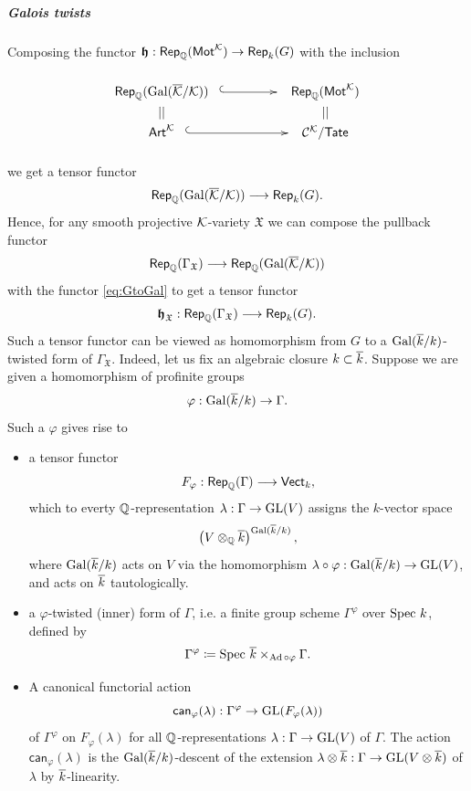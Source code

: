 \documentclass[twoside,leqno]{article}
\numberwithin{equation}{section}
\theoremstyle{plain}
\theoremstyle{definition}
\begin{document}
\subparagraph{Galois twists} \label{subpar:galois}

Composing the functor $\boldsymbol{\mathfrak{h}} : \mathsf{Rep}_{\mathbb Q}(\mathsf{Mot}^{\mathcal K}) \to
 \mathsf{Rep}_{k}(G)$ with the inclusion
\[
\xymatrix@R-3.5pc@M+0.7pc@C+1.5pc{
  \mathsf{Rep}_{\bbQ}(\Gal(\kaybar/\kay))  \ar@{^{(}->}[r]
  & \mathsf{Rep}_{\bbQ}(\motM^{\kay})  \\
|| & ||  \\
\mathsf{Art}^{\kay} \ar@{^{(}->}[r] & \CA{\kay}/\mathsf{Tate}  
}
\]
we get a tensor functor
\begin{equation} \label{eq:GtoGal}
  \mathsf{Rep}_{\mathbb Q}(\operatorname{Gal}(\overline{\mathcal K}/\mathcal K)) \longrightarrow \mathsf{Rep}_{k}(G).
\end{equation}
Hence, for any smooth projective $\mathcal K$-variety $\mathfrak{X}$ we can
compose the pullback functor 
\[
\mathsf{Rep}_{\mathbb Q}(\Gamma_{\mathfrak{X}}) \longrightarrow
\mathsf{Rep}_{\mathbb Q}(\operatorname{Gal}(\overline{\mathcal K}/\mathcal K))
\]
with the functor \eqref{eq:GtoGal}
to get a tensor functor 
 \begin{equation} \label{eq:GtoGamma}
   \boldsymbol{\mathfrak{h}}_{\mathfrak{X}} :
   \mathsf{Rep}_{\mathbb Q}(\Gamma_{\mathfrak{X}}) \longrightarrow \mathsf{Rep}_{k}(G).
 \end{equation}
Such a tensor functor can be viewed as homomorphism from $G$ to a
$\operatorname{Gal}(\overline{k}/k)$-twisted form of $\Gamma_{\mathfrak{X}}$. Indeed, let
us fix an algebraic closure $k \subset \overline{k}$.  Suppose we are given a
homomorphism of profinite groups
\[
\varphi : \operatorname{Gal}(\overline{k}/k) \to \Gamma.
\]
Such a $\varphi$ gives rise to
\begin{itemize}[wide]
\item[(a)] a tensor functor
\[
F_{\varphi} : \mathsf{Rep}_{\mathbb Q}(\Gamma) \longrightarrow \mathsf{Vect}_{k},
\]
which to everty $\mathbb Q$-representation $\lambda : \Gamma \to \operatorname{GL}(V)$ assigns
the $k$-vector space 
\[
\left(V\otimes_{\mathbb Q} \overline{k}\right)^{\operatorname{Gal}(\overline{k}/k)},
\]
where $\operatorname{Gal}(\overline{k}/k)$ acts on $V$ via the homomorphism $\lambda\circ
\varphi : \operatorname{Gal}(\overline{k}/k) \to \operatorname{GL}(V)$, and acts on $\overline{k}$
  tautologically.
\item[(b)] a $\varphi$-twisted (inner) form of $\Gamma$, i.e. a
  finite group scheme $\Gamma^{\varphi}$ over $\operatorname{Spec}\, k$,  defined by
\[
\Gamma^{\varphi} \coloneqq \operatorname{Spec}\, \overline{k} \times_{\operatorname{Ad}\circ \varphi} \Gamma. 
\]
\item[(c)] A canonical functorial action
  \[
  \mathsf{can}_{\varphi}(\lambda) : \Gamma^{\varphi} \to \operatorname{GL}(F_{\varphi}(\lambda))
  \]
  of $\Gamma^{\varphi}$ on
  $F_{\varphi}(\lambda)$ for all $\mathbb Q$-representations $\lambda :
  \Gamma \to \operatorname{GL}(V)$ of $\Gamma$. The action $\mathsf{can}_{\varphi}(\lambda)$
  is the
  $\operatorname{Gal}(\overline{k}/k)$-descent of the extension $\lambda\otimes {\overline{k}} : \Gamma
  \to \operatorname{GL}(V\otimes \overline{k})$ of $\lambda$ by $\overline{k}$-linearity.
\end{itemize}
\end{document}
